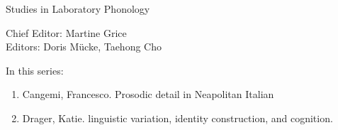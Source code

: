 
{\raggedleft{}}

\bigskip

{\large Studies in Laboratory Phonology}

\bigskip

Chief Editor:  Martine Grice%
\\
Editors:    Doris Mücke, %
    Taehong Cho %

\bigskip

In this series:

\begin{enumerate}
\item Cangemi, Francesco. Prosodic detail in Neapolitan Italian
\item Drager, Katie. linguistic variation, identity construction, and cognition.
\end{enumerate}